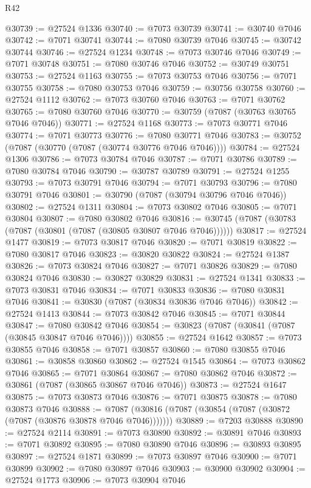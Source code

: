 \begin{lexlean}{R42}
\begin{coremodule}
{@30739 := @27524 @1336
@30740 := @7073 @30739
@30741 := @30740 @7046
@30742 := @7071 @30741
@30744 := @7080 @30739 @7046
@30745 := @30742 @30744
@30746 := @27524 @1234
@30748 := @7073 @30746 @7046
@30749 := @7071 @30748
@30751 := @7080 @30746 @7046
@30752 := @30749 @30751
@30753 := @27524 @1163
@30755 := @7073 @30753 @7046
@30756 := @7071 @30755
@30758 := @7080 @30753 @7046
@30759 := @30756 @30758
@30760 := @27524 @1112
@30762 := @7073 @30760 @7046
@30763 := @7071 @30762
@30765 := @7080 @30760 @7046
@30770 := @30759 (@7087 (@30763 @30765 @7046 @7046))
@30771 := @27524 @1168
@30773 := @7073 @30771 @7046
@30774 := @7071 @30773
@30776 := @7080 @30771 @7046
@30783 := @30752 (@7087 (@30770 (@7087 (@30774 @30776 @7046 @7046))))
@30784 := @27524 @1306
@30786 := @7073 @30784 @7046
@30787 := @7071 @30786
@30789 := @7080 @30784 @7046
@30790 := @30787 @30789
@30791 := @27524 @1255
@30793 := @7073 @30791 @7046
@30794 := @7071 @30793
@30796 := @7080 @30791 @7046
@30801 := @30790 (@7087 (@30794 @30796 @7046 @7046))
@30802 := @27524 @1311
@30804 := @7073 @30802 @7046
@30805 := @7071 @30804
@30807 := @7080 @30802 @7046
@30816 := @30745 (@7087 (@30783 (@7087 (@30801 (@7087 (@30805 @30807 @7046 @7046))))))
@30817 := @27524 @1477
@30819 := @7073 @30817 @7046
@30820 := @7071 @30819
@30822 := @7080 @30817 @7046
@30823 := @30820 @30822
@30824 := @27524 @1387
@30826 := @7073 @30824 @7046
@30827 := @7071 @30826
@30829 := @7080 @30824 @7046
@30830 := @30827 @30829
@30831 := @27524 @1341
@30833 := @7073 @30831 @7046
@30834 := @7071 @30833
@30836 := @7080 @30831 @7046
@30841 := @30830 (@7087 (@30834 @30836 @7046 @7046))
@30842 := @27524 @1413
@30844 := @7073 @30842 @7046
@30845 := @7071 @30844
@30847 := @7080 @30842 @7046
@30854 := @30823 (@7087 (@30841 (@7087 (@30845 @30847 @7046 @7046))))
@30855 := @27524 @1642
@30857 := @7073 @30855 @7046
@30858 := @7071 @30857
@30860 := @7080 @30855 @7046
@30861 := @30858 @30860
@30862 := @27524 @1545
@30864 := @7073 @30862 @7046
@30865 := @7071 @30864
@30867 := @7080 @30862 @7046
@30872 := @30861 (@7087 (@30865 @30867 @7046 @7046))
@30873 := @27524 @1647
@30875 := @7073 @30873 @7046
@30876 := @7071 @30875
@30878 := @7080 @30873 @7046
@30888 := @7087 (@30816 (@7087 (@30854 (@7087 (@30872 (@7087 (@30876 @30878 @7046 @7046)))))))
@30889 := @7203 @30888
@30890 := @27524 @2114
@30891 := @7073 @30890
@30892 := @30891 @7046
@30893 := @7071 @30892
@30895 := @7080 @30890 @7046
@30896 := @30893 @30895
@30897 := @27524 @1871
@30899 := @7073 @30897 @7046
@30900 := @7071 @30899
@30902 := @7080 @30897 @7046
@30903 := @30900 @30902
@30904 := @27524 @1773
@30906 := @7073 @30904 @7046
}
\end{coremodule}
\end{lexlean}
